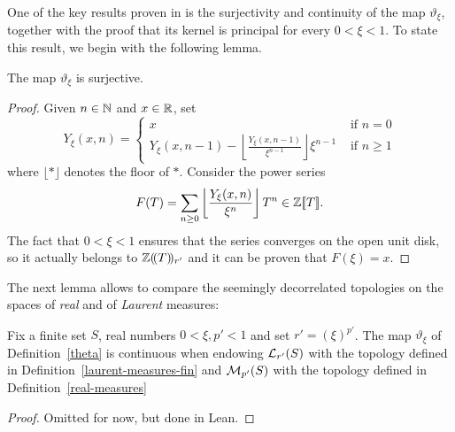 One of the key results proven in \cite[\S 6]{Analytic} is the surjectivity and continuity of the map $\vartheta_\xi$, together with the proof that its kernel is principal for every $0<\xi<1$. To state this result, we begin with the following lemma.


\begin{lemma}
  \label{theta.surjective}
  \leanok
  The map $\vartheta_{\xi}$ is surjective.
\end{lemma}

\begin{proof}
  \leanok
  Given $n\in\mathbb{N}$ and $x\in\mathbb{R}$, set
	\[
		Y_\xi(x, n)=
		\begin{cases}
			x&\text{ if } n = 0 \\
			Y_\xi(x,n-1) - \left\lfloor \frac{Y_\xi(x,n-1)}{\xi^{n-1}} \right\rfloor \xi^{n-1} & \text{ if } n \ge 1
		\end{cases}
	\]
where $\lfloor \ast \rfloor$ denotes the floor of $\ast$. Consider the power series
  \[
    F(T)=\sum_{n\geq 0}\left\lfloor \frac{Y_\xi(x,n)}{\xi^n}\right\rfloor T^n\in\mathbb{Z}[\![T]\!].
  \]
	The fact that $0<\xi<1$ ensures that the series converges on the open unit disk, so it actually belongs to $\mathbb{Z}(\!(T)\!)_{r'}$ and it can be proven that $F(\xi)=x$.
\end{proof}
The next lemma allows to compare the seemingly decorrelated topologies on the spaces of \emph{real} and of \emph{Laurent} measures:
\begin{lemma}
	\label{theta.continuous}
	\leanok
Fix a finite set $S$, real numbers $0<\xi,p'<1$ and set $r'=(\xi)^{p'}$. The map $\vartheta_\xi$ of Definition~\ref{theta} is continuous when endowing $\mathcal L_{r'}(S)$ with the topology defined in Definition~\ref{laurent-measures-fin} and $\mathcal M_{p'}(S)$ with the topology defined in Definition~\ref{real-measures}
\end{lemma}
\begin{proof}
  \leanok
  Omitted for now, but done in Lean.
\end{proof}

